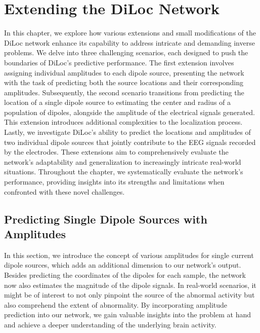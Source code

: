 \documentclass[a4paper, UKenglish, 11pt]{uiomaster}
\begin{document}
\chapter{Extending the DiLoc Network}
In this chapter, we explore how various extensions and small modifications of the DiLoc network enhance its capability to address intricate and demanding inverse problems. We delve into three challenging scenarios, each designed to push the boundaries of DiLoc's predictive performance. The first extension involves assigning individual amplitudes to each dipole source, presenting the network with the task of predicting both the source locations and their corresponding amplitudes. Subsequently, the second scenario transitions from predicting the location of a single dipole source to estimating the center and radius of a population of dipoles, alongside the amplitude of the electrical signals generated. This extension introduces additional complexities to the localization process. Lastly, we investigate DiLoc's ability to predict the locations and amplitudes of two individual dipole sources that jointly contribute to the EEG signals recorded by the electrodes. These extensions aim to comprehensively evaluate the network's adaptability and generalization to increasingly intricate real-world situations. Throughout the chapter, we systematically evaluate the network's performance, providing insights into its strengths and limitations when confronted with these novel challenges.

\section{Predicting Single Dipole Sources with Amplitudes}

In this section, we introduce the concept of various amplitudes for single current dipole sources, which adds an additional dimension to our network's output. Besides predicting the coordinates of the dipoles for each sample, the network now also estimates the magnitude of the dipole signals. In real-world scenarios, it might be of interest to not only pinpoint the source of the abnormal activity but also comprehend the extent of abnormality. By incorporating amplitude prediction into our network, we gain valuable insights into the problem at hand and achieve a deeper understanding of the underlying brain activity.

\end{document}
